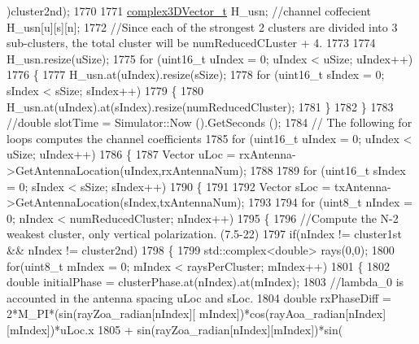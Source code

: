 \begin{DoxyCode}
      )cluster2nd);
1770 
1771         \hyperlink{namespacens3_afbc512ea4e4657e80b7ac44f78fc81ad}{complex3DVector\_t} H\_usn; \textcolor{comment}{//channel coffecient H\_usn[u][s][n];}
1772         \textcolor{comment}{//Since each of the strongest 2 clusters are divided into 3 sub-clusters, the total cluster will be
       numReducedCLuster + 4.}
1773 
1774         H\_usn.resize(uSize);
1775         \textcolor{keywordflow}{for} (uint16\_t uIndex = 0; uIndex < uSize; uIndex++)
1776         \{
1777                 H\_usn.at(uIndex).resize(sSize);
1778                 \textcolor{keywordflow}{for} (uint16\_t sIndex = 0; sIndex < sSize; sIndex++)
1779                 \{
1780                         H\_usn.at(uIndex).at(sIndex).resize(numReducedCluster);
1781                 \}
1782         \}
1783         \textcolor{comment}{//double slotTime = Simulator::Now ().GetSeconds ();}
1784         \textcolor{comment}{// The following for loops computes the channel coefficients}
1785         \textcolor{keywordflow}{for} (uint16\_t uIndex = 0; uIndex < uSize; uIndex++)
1786         \{
1787                 Vector uLoc = rxAntenna->GetAntennaLocation(uIndex,rxAntennaNum);
1788 
1789                 \textcolor{keywordflow}{for} (uint16\_t sIndex = 0; sIndex < sSize; sIndex++)
1790                 \{
1791 
1792                         Vector sLoc = txAntenna->GetAntennaLocation(sIndex,txAntennaNum);
1793 
1794                         \textcolor{keywordflow}{for} (uint8\_t nIndex = 0; nIndex < numReducedCluster; nIndex++)
1795                         \{
1796                                 \textcolor{comment}{//Compute the N-2 weakest cluster, only vertical polarization. (7.5-22)}
1797                                 \textcolor{keywordflow}{if}(nIndex != cluster1st && nIndex != cluster2nd)
1798                                 \{
1799                                         std::complex<double> rays(0,0);
1800                                         \textcolor{keywordflow}{for}(uint8\_t mIndex = 0; mIndex < raysPerCluster; mIndex++)
1801                                         \{
1802                                                 \textcolor{keywordtype}{double} initialPhase = clusterPhase.at(nIndex).at(mIndex);
1803                                                 \textcolor{comment}{//lambda\_0 is accounted in the antenna spacing uLoc and
       sLoc.}
1804                                                 \textcolor{keywordtype}{double} rxPhaseDiff = 2*M\_PI*(sin(rayZoa\_radian[nIndex][
      mIndex])*cos(rayAoa\_radian[nIndex][mIndex])*uLoc.x
1805                                                                 + sin(rayZoa\_radian[nIndex][mIndex])*sin(

\end{DoxyCode}
